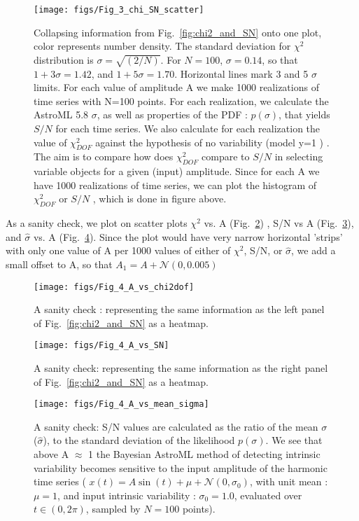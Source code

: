 \documentclass[fleqn,usenatbib]{mnras}  %
\begin{document}
\begin{figure}
  \texttt{[image: figs/Fig\_3\_chi\_SN\_scatter]}
  \caption{Collapsing information from Fig.~\ref{fig:chi2_and_SN} onto one plot, color represents number density. The standard deviation for $\chi^{2}$ distribution is $\sigma = \sqrt{(2/N)}$. For $N=100$, $\sigma = 0.14$, so that $1+3 \sigma = 1.42$, and $1+5\sigma=1.70$.  Horizontal lines mark 3 and 5 $\sigma$ limits. For each value of amplitude A we make 1000 realizations of time series with N=100 points.  For each realization, we calculate the AstroML 5.8 $\sigma$, as well as properties of the PDF : $p(\sigma)$, that yields $S/N$ for each time series.  We also calculate for each realization the value of $\chi^{2}_{DOF}$ against the hypothesis of no variability (model y=1 ) . The aim is to compare how does $\chi^{2}_{DOF}$ compare to $S/N$ in selecting variable objects for a given (input) amplitude. Since for each A we have 1000 realizations of time series, we can plot the histogram of $\chi^{2}_{DOF}$ or $S/N$ , which is done in figure above. }
  \label{fig:chi_sn_scatter}
\end{figure}

As a sanity check, we  plot on scatter plots  $\chi^{2}$ vs. A (Fig.~\ref{fig:A_vs_chi2}) ,  S/N  vs A (Fig.~\ref{fig:A_vs_SN}),  and $\hat \sigma$ vs. A (Fig.~\ref{fig:A_vs_sigma}). Since the plot would have very narrow  horizontal 'strips' with only one value of A per 1000 values of either of $\chi^{2}$, S/N, or $\hat \sigma$, we add a small offset to A, so that $A_{1} = A + \mathcal{N}(0,0.005)$

\begin{figure}
 \texttt{[image: figs/Fig\_4\_A\_vs\_chi2dof]}
  \caption{A sanity check :  representing the same information as the left panel of Fig.~\ref{fig:chi2_and_SN} as a heatmap.}
\label{fig:A_vs_chi2}
\end{figure}


\begin{figure}
 \texttt{[image: figs/Fig\_4\_A\_vs\_SN]}
  \caption{A sanity check: representing the same information as the right panel of Fig.~\ref{fig:chi2_and_SN} as a heatmap.}
\label{fig:A_vs_SN}
\end{figure}


\begin{figure}
 \texttt{[image: figs/Fig\_4\_A\_vs\_mean\_sigma]}
  \caption{A sanity check: S/N values are calculated as the ratio of the  mean $\sigma$   ($\hat \sigma$), to the standard deviation of the likelihood $p(\sigma)$. We see that above A $\approx$ 1 the Bayesian AstroML method of detecting intrinsic variability becomes sensitive to the input amplitude of the harmonic time series ( $x(t) = A \sin{(t)}+\mu+\mathcal{N}(0,\sigma_{0})$, with unit mean : $\mu = 1$, and input intrinsic variability : $\sigma_{0} = 1.0 $, evaluated over $t \in (0,2 \pi)$, sampled by $N=100$ points).}
\label{fig:A_vs_sigma}
\end{figure}
\end{document}
